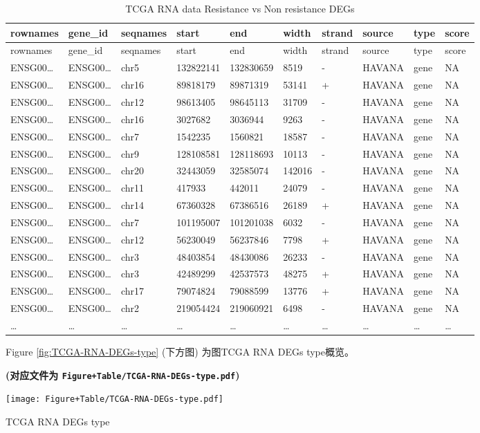 \documentclass[
]{article}
\begin{document}
\begin{longtable}[]{@{}llllllllll@{}}
\caption{\label{tab:TCGA-RNA-data-Resistance-vs-Non-resistance-DEGs}TCGA RNA data Resistance vs Non resistance DEGs}\tabularnewline
\toprule
rownames & gene\_id & seqnames & start & end & width & strand & source & type & score\tabularnewline
\midrule
\endfirsthead
\toprule
rownames & gene\_id & seqnames & start & end & width & strand & source & type & score\tabularnewline
\midrule
\endhead
ENSG00\ldots{} & ENSG00\ldots{} & chr5 & 132822141 & 132830659 & 8519 & - & HAVANA & gene & NA\tabularnewline
ENSG00\ldots{} & ENSG00\ldots{} & chr16 & 89818179 & 89871319 & 53141 & + & HAVANA & gene & NA\tabularnewline
ENSG00\ldots{} & ENSG00\ldots{} & chr12 & 98613405 & 98645113 & 31709 & - & HAVANA & gene & NA\tabularnewline
ENSG00\ldots{} & ENSG00\ldots{} & chr16 & 3027682 & 3036944 & 9263 & - & HAVANA & gene & NA\tabularnewline
ENSG00\ldots{} & ENSG00\ldots{} & chr7 & 1542235 & 1560821 & 18587 & - & HAVANA & gene & NA\tabularnewline
ENSG00\ldots{} & ENSG00\ldots{} & chr9 & 128108581 & 128118693 & 10113 & - & HAVANA & gene & NA\tabularnewline
ENSG00\ldots{} & ENSG00\ldots{} & chr20 & 32443059 & 32585074 & 142016 & - & HAVANA & gene & NA\tabularnewline
ENSG00\ldots{} & ENSG00\ldots{} & chr11 & 417933 & 442011 & 24079 & - & HAVANA & gene & NA\tabularnewline
ENSG00\ldots{} & ENSG00\ldots{} & chr14 & 67360328 & 67386516 & 26189 & + & HAVANA & gene & NA\tabularnewline
ENSG00\ldots{} & ENSG00\ldots{} & chr7 & 101195007 & 101201038 & 6032 & - & HAVANA & gene & NA\tabularnewline
ENSG00\ldots{} & ENSG00\ldots{} & chr12 & 56230049 & 56237846 & 7798 & + & HAVANA & gene & NA\tabularnewline
ENSG00\ldots{} & ENSG00\ldots{} & chr3 & 48403854 & 48430086 & 26233 & - & HAVANA & gene & NA\tabularnewline
ENSG00\ldots{} & ENSG00\ldots{} & chr3 & 42489299 & 42537573 & 48275 & + & HAVANA & gene & NA\tabularnewline
ENSG00\ldots{} & ENSG00\ldots{} & chr17 & 79074824 & 79088599 & 13776 & + & HAVANA & gene & NA\tabularnewline
ENSG00\ldots{} & ENSG00\ldots{} & chr2 & 219054424 & 219060921 & 6498 & - & HAVANA & gene & NA\tabularnewline
\ldots{} & \ldots{} & \ldots{} & \ldots{} & \ldots{} & \ldots{} & \ldots{} & \ldots{} & \ldots{} & \ldots{}\tabularnewline
\bottomrule
\end{longtable}

Figure \ref{fig:TCGA-RNA-DEGs-type} (下方图) 为图TCGA RNA DEGs type概览。

\textbf{(对应文件为 \texttt{Figure+Table/TCGA-RNA-DEGs-type.pdf})}

\def\@captype{figure}
\begin{center}
\texttt{[image: Figure+Table/TCGA-RNA-DEGs-type.pdf]}
\caption{TCGA RNA DEGs type}\label{fig:TCGA-RNA-DEGs-type}
\end{center}
\end{document}
